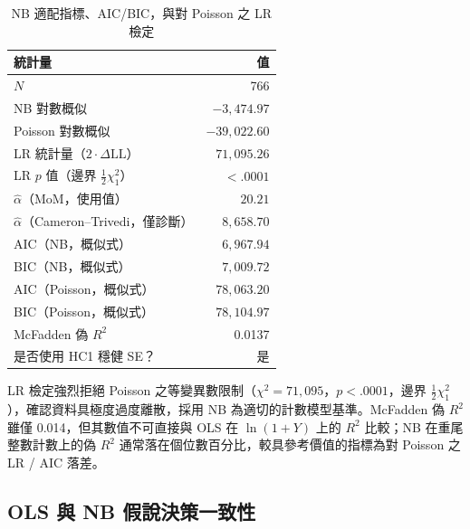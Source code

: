 \documentclass[12pt,a4paper]{ctexart}
\begin{document}
\begin{table}[H]
\centering
\caption{NB 適配指標、AIC/BIC，與對 Poisson 之 LR 檢定}
\small
\begin{tabular}{lr}
\toprule
統計量 & 值 \\
\midrule
$N$ & 766 \\
NB 對數概似 & $-3{,}474.97$ \\
Poisson 對數概似 & $-39{,}022.60$ \\
LR 統計量（$2\cdot\Delta\text{LL}$） & $71{,}095.26$ \\
LR $p$ 值（邊界 $\tfrac12\chi^2_1$） & $<.0001$ \\
$\hat\alpha$（MoM，使用值） & $20.21$ \\
$\hat\alpha$（Cameron--Trivedi，僅診斷） & $8{,}658.70$ \\
AIC（NB，概似式） & $6{,}967.94$ \\
BIC（NB，概似式） & $7{,}009.72$ \\
AIC（Poisson，概似式） & $78{,}063.20$ \\
BIC（Poisson，概似式） & $78{,}104.97$ \\
McFadden 偽 $R^{2}$ & 0.0137 \\
是否使用 HC1 穩健 SE？ & 是 \\
\bottomrule
\end{tabular}
\end{table}

LR 檢定強烈拒絕 Poisson 之等變異數限制（$\chi^2 = 71{,}095$，$p<.0001$，邊界 $\tfrac12 \chi^2_1$），確認資料具極度過度離散，採用 NB 為適切的計數模型基準。McFadden 偽 $R^2$ 雖僅 0.014，但其數值不可直接與 OLS 在 $\ln(1+Y)$ 上的 $R^2$ 比較；NB 在重尾整數計數上的偽 $R^2$ 通常落在個位數百分比，較具參考價值的指標為對 Poisson 之 LR / AIC 落差。

\subsection{OLS 與 NB 假說決策一致性}
\end{document}
